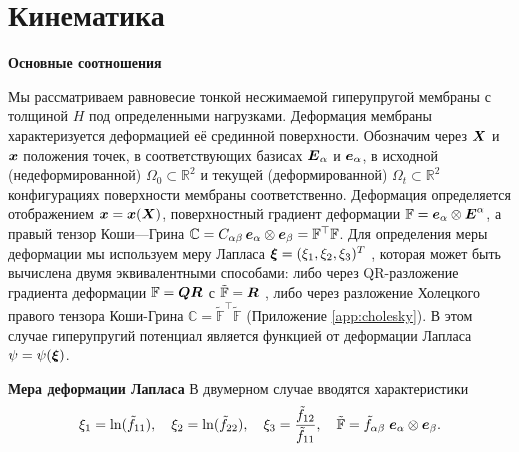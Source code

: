 \section{Кинематика}
\textbf{Основные соотношения}

Мы рассматриваем равновесие тонкой несжимаемой гиперупругой мембраны с толщиной $H$ под
определенными нагрузками.
Деформация мембраны характеризуется деформацией её срединной поверхности. 
Обозначим через \(\boldsymbol{X}\) и \(\boldsymbol{x}\) положения точек, 
в соответствующих базисах \(\boldsymbol{E}_{\alpha}\) и \(\boldsymbol{e}_{\alpha}\), 
в исходной (недеформированной) \(\Omega_0 \subset \mathbb{R}^2\) и текущей (деформированной) \(\Omega_t \subset \mathbb{R}^2\)
конфигурациях поверхности мембраны соответственно. 
Деформация определяется отображением \(\boldsymbol{x} = \boldsymbol{x}(\boldsymbol{X})\), 
поверхностный градиент деформации \(\mathbb{F} = \boldsymbol{e}_{\alpha}\otimes\boldsymbol{E}^{\alpha}\),
а правый тензор Коши—Грина \(\mathbb C = C_{\alpha\beta} \,\boldsymbol{e}_{\alpha} \otimes \boldsymbol{e}_{\beta} = \mathbb F^{\top} \mathbb F\). 
Для определения меры деформации мы используем меру Лапласа \(\boldsymbol{\xi} = (\xi_1 , \xi_2 , \xi_3)^T\) \cite{xi2023},
которая может быть вычислена двумя эквивалентными способами: 
либо через QR-разложение градиента деформации \(\mathbb F = \boldsymbol{Q} \boldsymbol{R}\) с \(\tilde{\mathbb F} = \boldsymbol{R}\) , 
либо через разложение Холецкого правого тензора Коши-Грина \(\mathbb C = \tilde{\mathbb F}^{\top}\tilde{\mathbb F}\) (Приложение \ref{app:cholesky}).
В этом случае гиперупругий потенциал является функцией от деформации Лапласа \(\psi = \psi(\boldsymbol{\xi})\).


\textbf{Мера деформации Лапласа}
В двумерном случае вводятся характеристики
\begin{equation}
\xi_1 = \ln(\tilde f_{11}),\quad \xi_2 = \ln(\tilde f_{22}),\quad \xi_3 = \frac{\tilde f_{12}}{\tilde f_{11}}, 
\quad \tilde{\mathbb F} = \tilde f_{\alpha\beta} \; \boldsymbol{e}_{\alpha} \otimes \boldsymbol{e}_{\beta}.
\label{eq:laplace_coords}
\end{equation}


